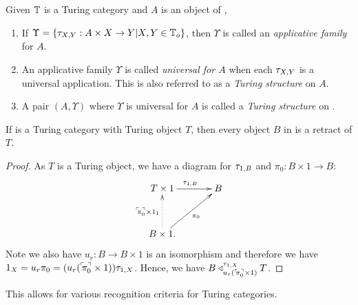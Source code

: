 \begin{definition}\label{def:turing_structure}
  Given $\mathbb{T}$ is a Turing category and $A$ is an object of \T,
  \begin{enumerate}[{(}i{)}]
    \item If $\Upsilon=\{\tau_{{X},{Y}}: A\times X \to Y | X,Y \in {\ensuremath{\mathbb{T}}}_o\}$, then $\Upsilon$ is called an
      \emph{applicative family} for $A$.
    \item An applicative family $\Upsilon$ is called \emph{universal for $A$} when each $\tau_{{X},{Y}}$ is
      a universal application. This is also referred to as a \emph{Turing structure} on $A$.
    \item A pair $(A,\Upsilon)$ where $\Upsilon$ is universal for $A$ is called a \emph{Turing
      structure} on \T.
  \end{enumerate}
\end{definition}

\begin{lemma}\label{lem:turing_object_is_retractable}
  If \T is a Turing category with Turing object $T$, then every object $B$ in \T is a retract of
  $T$.
\end{lemma}
\begin{proof}
  As $T$ is a Turing object, we have a diagram for $\tau_{{1},{B}}$ and $\pi_0:B\times 1 \to B$:
  \[
    \xymatrix@C+10pt@R+10pt{
      T\times 1 \ar[r]^{\tur{1}{B}} & B \\
      B\times 1. \ar@{.>}[u]^{\name{\pi_0}\times 1_1} \ar[ur]_{\pi_0}
    }
  \]
  Note we also have $u_r:B\to B\times 1$ is an
  isomorphism and therefore we have $1_X = u_r \pi_0 = (u_r ({}^\ulcorner\!\!\pi_0^\urcorner\times 1)) \tau_{{1},{X}}$. Hence, we
  have $B \triangleleft_{u_r ({}^\ulcorner\!\!\pi_0^\urcorner\times 1)}^{\tau_{{1},{X}}} T$.
\end{proof}

This allows for various recognition criteria for Turing categories.

